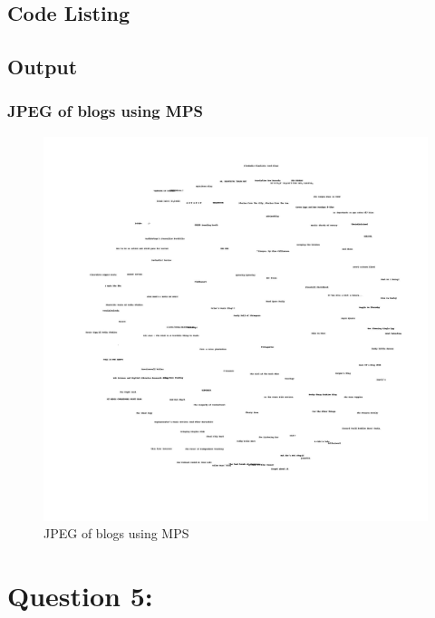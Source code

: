 \documentclass[12pt]{article}
\begin{document}
\subsection{Code Listing}

\newpage

\subsection{Output}
\subsubsection{JPEG of blogs using MPS}
\begin{figure}[ht]
\includegraphics[scale=0.2]{../../q4/draw2d.jpg}
\centering
\caption{JPEG of blogs using MPS}
\label{JPEG of blogs using MPS}
\end{figure}
\newpage
\section{Question 5: }
\end{document}
